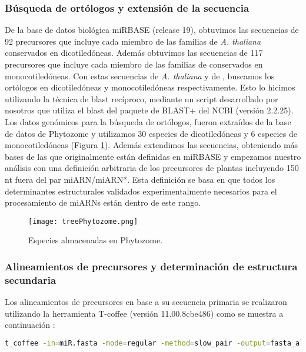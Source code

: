 \subsubsection{Búsqueda de ortólogos y extensión de la secuencia}
De la base de datos biológica miRBASE (release 19), obtuvimos las secuencias de 92 precursores que incluye cada miembro de las familias de \textit{A. thaliana} conservados en dicotiledóneas.
Además obtuvimos las secuencias de 117 precursores que incluye cada miembro de las familias de  conservados en monocotiledóneas.
Con estas secuencias de \textit{A. thaliana} y de , buscamos los ortólogos en dicotiledóneas y monocotiledóneas respectivamente.
Esto lo hicimos utilizando la técnica de blast recíproco, mediante un script desarrollado por nosotros que utiliza el blast del paquete de BLAST+ del NCBI (versión 2.2.25).
Los datos genómicos para la búsqueda de ortólogos, fueron extraídos de la base de datos de Phytozome y utilizamos 30 especies de dicotiledóneas y 6 especies de monocotiledóneas (Figura \ref{fig:treePhytozome}).
Además extendimos las secuencias, obteniendo más bases de las que originalmente están definidas en miRBASE y empezamos nuestro análisis con una definición arbitraria de los precursores de plantas incluyendo 150 nt fuera del par miARN/miARN*.
Esta definición se basa en que todos los determinantes estructurales validados experimentalmente necesarios para el procesamiento de miARNs están dentro de este rango.

\begin{figure}[htbp!] 
    \centering    
    \texttt{[image: treePhytozome.png]}
    \caption[Especies almacenadas en Phytozome]{Especies almacenadas en Phytozome.}
    \label{fig:treePhytozome}
\end{figure}

\subsubsection{Alineamientos de precursores y determinación de estructura secundaria}

Los alineamientos de precursores en base a su secuencia primaria se realizaron utilizando la herramienta T-coffee (versión 11.00.8cbe486) \citep{pmid10964570} como se muestra a continuación :

\begin{lstlisting}[language=bash]
t_coffee -in=miR.fasta -mode=regular -method=slow_pair -output=fasta_aln -quiet=stdout -out=miR.aln
\end{lstlisting}

